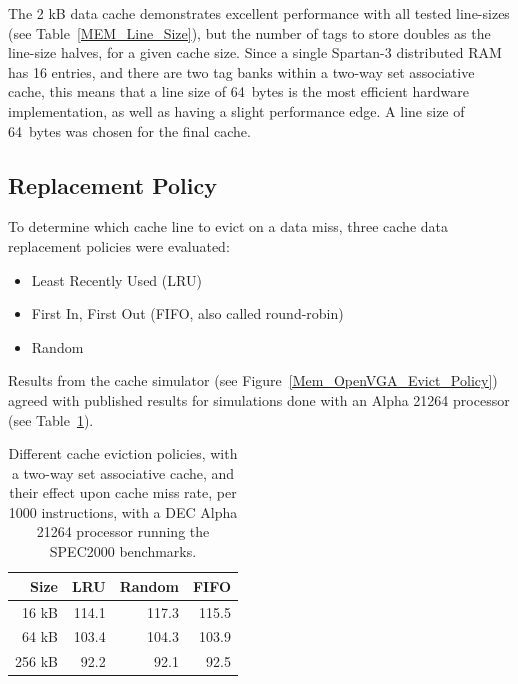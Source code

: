 The 2 kB data cache demonstrates excellent performance with all tested line-sizes
(see Table~\ref{MEM_Line_Size}), but the number of tags to store doubles as the
line-size halves, for a given cache size. Since a single Spartan-3 distributed
RAM has 16 entries, and there are two tag banks within a two-way set associative
cache, this means that a line size of 64~bytes is the most efficient hardware
implementation, as well as having a slight performance edge. A line size of
64~bytes was chosen for the final cache.


\subsection{Replacement Policy}
To determine which cache line to evict on a data miss, three cache data
replacement policies were evaluated:
\begin{itemize}
 \item Least Recently Used (LRU)
 \item First In, First Out (FIFO, also called round-robin)
 \item Random
\end{itemize}

Results from the cache simulator (see Figure~\ref{Mem_OpenVGA_Evict_Policy})
agreed with published results for simulations done with an Alpha 21264
processor\cite{Comp_Arch} (see Table~\ref{Mem_Alpha_Evict_Policy}).

\begin{table}[h!]
\begin{center}
\begin{tabular}{r r r r}
Size & LRU & Random & FIFO \\
\hline
16 kB & 114.1 & 117.3 & 115.5 \\
64 kB & 103.4 & 104.3 & 103.9 \\
256 kB & 92.2 & 92.1 & 92.5 \\
\end{tabular}
\caption[DEC Alpha 21264 cache eviction policy vs. performance]{Different
cache eviction policies, with a two-way set associative cache, and their effect
upon cache miss rate, per 1000 instructions, with a DEC Alpha 21264 processor
running the SPEC2000 benchmarks\cite{Comp_Arch}.}
\label{Mem_Alpha_Evict_Policy}
\end{center}
\end{table}

